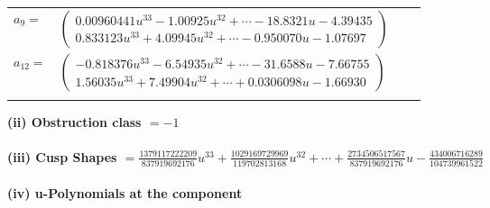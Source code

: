 \documentclass[1p]{elsarticle_modified}
\theoremstyle{definition}
\begin{document}
\begin{tabular}{m{7pt} m{180pt} m{7pt} m{180pt} }
\flushright $a_{9}=$&$\begin{pmatrix}0.00960441 u^{33}-1.00925 u^{32}+\cdots-18.8321 u-4.39435\\0.833123 u^{33}+4.09945 u^{32}+\cdots-0.950070 u-1.07697\end{pmatrix}$ \\
\flushright $a_{12}=$&$\begin{pmatrix}-0.818376 u^{33}-6.54935 u^{32}+\cdots-31.6588 u-7.66755\\1.56035 u^{33}+7.49904 u^{32}+\cdots+0.0306098 u-1.66930\end{pmatrix}$\\&\end{tabular}
\flushleft \textbf{(ii) Obstruction class $= -1$}\\~\\
\flushleft \textbf{(iii) Cusp Shapes $= \frac{1379117222209}{837919692176} u^{33}+\frac{1029169729969}{119702813168} u^{32}+\cdots+\frac{2734506517567}{837919692176} u-\frac{434006716289}{104739961522}$}\\~\\
\newpage\renewcommand{\arraystretch}{1}
\flushleft \textbf{(iv) u-Polynomials at the component}\newline \\
\end{document}
